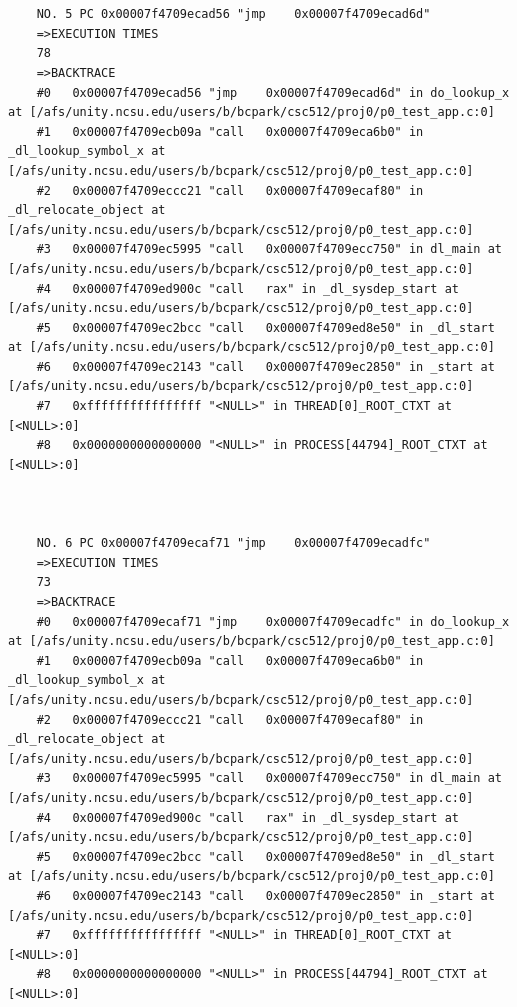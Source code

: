 \documentclass[11pt]{article}
\begin{document}
\begin{verbatim}
    
    
    NO. 5 PC 0x00007f4709ecad56 "jmp    0x00007f4709ecad6d"
    =>EXECUTION TIMES
    78
    =>BACKTRACE
    #0   0x00007f4709ecad56 "jmp    0x00007f4709ecad6d" in do_lookup_x at [/afs/unity.ncsu.edu/users/b/bcpark/csc512/proj0/p0_test_app.c:0]
    #1   0x00007f4709ecb09a "call   0x00007f4709eca6b0" in _dl_lookup_symbol_x at [/afs/unity.ncsu.edu/users/b/bcpark/csc512/proj0/p0_test_app.c:0]
    #2   0x00007f4709eccc21 "call   0x00007f4709ecaf80" in _dl_relocate_object at [/afs/unity.ncsu.edu/users/b/bcpark/csc512/proj0/p0_test_app.c:0]
    #3   0x00007f4709ec5995 "call   0x00007f4709ecc750" in dl_main at [/afs/unity.ncsu.edu/users/b/bcpark/csc512/proj0/p0_test_app.c:0]
    #4   0x00007f4709ed900c "call   rax" in _dl_sysdep_start at [/afs/unity.ncsu.edu/users/b/bcpark/csc512/proj0/p0_test_app.c:0]
    #5   0x00007f4709ec2bcc "call   0x00007f4709ed8e50" in _dl_start at [/afs/unity.ncsu.edu/users/b/bcpark/csc512/proj0/p0_test_app.c:0]
    #6   0x00007f4709ec2143 "call   0x00007f4709ec2850" in _start at [/afs/unity.ncsu.edu/users/b/bcpark/csc512/proj0/p0_test_app.c:0]
    #7   0xffffffffffffffff "<NULL>" in THREAD[0]_ROOT_CTXT at [<NULL>:0]
    #8   0x0000000000000000 "<NULL>" in PROCESS[44794]_ROOT_CTXT at [<NULL>:0]
    
    
    
    NO. 6 PC 0x00007f4709ecaf71 "jmp    0x00007f4709ecadfc"
    =>EXECUTION TIMES
    73
    =>BACKTRACE
    #0   0x00007f4709ecaf71 "jmp    0x00007f4709ecadfc" in do_lookup_x at [/afs/unity.ncsu.edu/users/b/bcpark/csc512/proj0/p0_test_app.c:0]
    #1   0x00007f4709ecb09a "call   0x00007f4709eca6b0" in _dl_lookup_symbol_x at [/afs/unity.ncsu.edu/users/b/bcpark/csc512/proj0/p0_test_app.c:0]
    #2   0x00007f4709eccc21 "call   0x00007f4709ecaf80" in _dl_relocate_object at [/afs/unity.ncsu.edu/users/b/bcpark/csc512/proj0/p0_test_app.c:0]
    #3   0x00007f4709ec5995 "call   0x00007f4709ecc750" in dl_main at [/afs/unity.ncsu.edu/users/b/bcpark/csc512/proj0/p0_test_app.c:0]
    #4   0x00007f4709ed900c "call   rax" in _dl_sysdep_start at [/afs/unity.ncsu.edu/users/b/bcpark/csc512/proj0/p0_test_app.c:0]
    #5   0x00007f4709ec2bcc "call   0x00007f4709ed8e50" in _dl_start at [/afs/unity.ncsu.edu/users/b/bcpark/csc512/proj0/p0_test_app.c:0]
    #6   0x00007f4709ec2143 "call   0x00007f4709ec2850" in _start at [/afs/unity.ncsu.edu/users/b/bcpark/csc512/proj0/p0_test_app.c:0]
    #7   0xffffffffffffffff "<NULL>" in THREAD[0]_ROOT_CTXT at [<NULL>:0]
    #8   0x0000000000000000 "<NULL>" in PROCESS[44794]_ROOT_CTXT at [<NULL>:0]
    

\end{verbatim}
\end{document}
